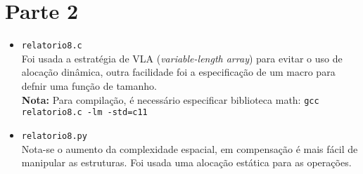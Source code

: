 \documentclass{article}
\begin{document}
    \section*{Parte 2}
        \begin{itemize}
            \item \texttt{relatorio8.c} \\
            Foi usada a estratégia de VLA (\textit{variable-length array}) para evitar o uso de alocação dinâmica, outra facilidade foi a especificação de um macro para defnir uma função de tamanho. \\
            \textbf{Nota:} Para compilação, é necessário especificar biblioteca math: \texttt{gcc relatorio8.c -lm -std=c11}
            
            \item \texttt{relatorio8.py} \\
            Nota-se o aumento da complexidade espacial, em compensação é mais fácil de manipular as estruturas. Foi usada uma alocação estática para as operações.
        \end{itemize}
\end{document}
